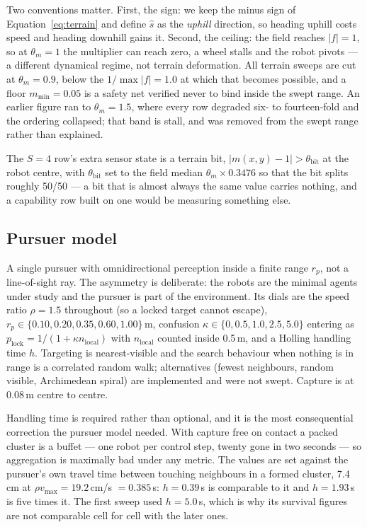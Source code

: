 \documentclass[11pt,a4paper]{article}
\begin{document}
Two conventions matter. First, the sign: we keep the minus sign of
Equation~\ref{eq:terrain} and define $\hat s$ as the \emph{uphill} direction, so
heading uphill costs speed and heading downhill gains it. Second, the ceiling:
the field reaches $|f| = 1$, so at $\theta_m = 1$ the multiplier can reach zero,
a wheel stalls and the robot pivots --- a different dynamical regime, not terrain
deformation. All terrain sweeps are cut at $\theta_m = 0.9$, below the
$1/\max|f| = 1.0$ at which that becomes possible, and a floor $m_{\min} = 0.05$
is a safety net verified never to bind inside the swept range. An earlier figure ran to
$\theta_m = 1.5$, where every row degraded six- to fourteen-fold and the ordering
collapsed; that band is stall, and was removed from the swept range rather than
explained.

The $S = 4$ row's extra sensor state is a terrain bit, $|m(x,y) - 1| > \theta_{
\mathrm{bit}}$ at the robot centre, with $\theta_{\mathrm{bit}}$ set to the field
median $\theta_m \times 0.3476$ so that the bit splits roughly 50/50 --- a bit
that is almost always the same value carries nothing, and a capability row built
on one would be measuring something else.

\subsection{Pursuer model}

A single pursuer with omnidirectional perception inside a finite range $r_p$, not
a line-of-sight ray. The asymmetry is deliberate: the robots are the minimal
agents under study and the pursuer is part of the environment. Its dials are the
speed ratio $\rho = 1.5$ throughout (so a locked target cannot escape),
$r_p \in \{0.10, 0.20, 0.35, 0.60, 1.00\}$\,m, confusion $\kappa \in \{0, 0.5,
1.0, 2.5, 5.0\}$ entering as $p_{\mathrm{lock}} = 1/(1 + \kappa
n_{\mathrm{local}})$ with $n_{\mathrm{local}}$ counted inside 0.5\,m, and a
Holling handling time $h$. Targeting is nearest-visible and the search behaviour
when nothing is in range is a correlated random walk; alternatives (fewest
neighbours, random visible, Archimedean spiral) are implemented and were not
swept. Capture is at 0.08\,m centre to centre.

Handling time is required rather than optional, and it is the most consequential
correction the pursuer model needed. With capture free on contact a packed
cluster is a buffet --- one robot per control step, twenty gone in two seconds ---
so aggregation is maximally bad under any metric. The values are set against the
pursuer's own travel time between touching neighbours in a formed cluster,
7.4\,cm at $\rho v_{\max} = 19.2$\,cm/s $= 0.385$\,s: $h = 0.39$\,s is comparable
to it and $h = 1.93$\,s is five times it. The first sweep used $h = 5.0$\,s,
which is why its survival figures are not comparable cell for cell with the
later ones.
\end{document}
